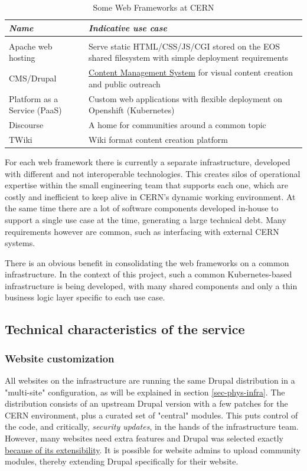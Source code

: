 \begin{table}[h!]
\begin{tabularx}{\textwidth}{ p{10em}| >{\raggedright\arraybackslash}X}
\emph{Name} & \emph{Indicative use case} \\
\hline \\
Apache web hosting & Serve static HTML/CSS/JS/CGI stored on the EOS shared filesystem with simple deployment requirements \\
CMS/Drupal & \hyperref[what-is-drupal]{Content Management System} for visual content creation and public outreach \\
Platform as a Service (PaaS) & Custom web applications with flexible deployment on Openshift (Kubernetes) \\
Discourse & A home for communities around a common topic \\
TWiki & Wiki format content creation platform
\end{tabularx}
\caption{Some Web Frameworks at CERN}
\label{tab-wf}
\end{table}

For each web framework there is currently a separate infrastructure, developed with different and not interoperable technologies.
This creates silos of operational expertise within the small engineering team that supports each one, which are costly and inefficient to keep alive in CERN's dynamic working environment.
At the same time there are a lot of software components developed in-house to support a single use case at the time, generating a large technical debt.
Many requirements however are common, such as interfacing with external CERN systems.

There is an obvious benefit in consolidating the web frameworks on a common infrastructure.
In the context of this project, such a common Kubernetes-based infrastructure is being developed,
with many shared components and only a thin business logic layer specific to each use case.

\subsection{Technical characteristics of the service}

\subsubsection*{Website customization}

All websites on the infrastructure are running the same Drupal distribution in a "multi-site" configuration, as will be explained in section \ref{sec-phys-infra}.
The distribution consists of an upstream Drupal version with a few patches for the CERN environment, plus a curated set of "central" modules.
This puts control of the code, and critically, \emph{security updates}, in the hands of the infrastructure team.
However, many websites need extra features and Drupal was selected exactly \hyperref[drupal-at-cern]{because of its extensibility}.
It is possible for website admins to upload community modules, thereby extending Drupal specifically for their website.

